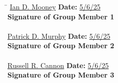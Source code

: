 \documentclass{article}
\begin{document}
\begin{tabbing}
\hspace{8cm}\=\kill
\underline{\hspace{3.0cm}Ian D. Mooney} \> \textbf{Date:} \underline{\hspace{3cm}5/6/25} \\
\textbf{Signature of Group Member 1} \\
\\
\underline{\hspace{2.5cm}Patrick D. Murphy} \> \textbf{Date:} \underline{\hspace{3cm}5/6/25} \\
\textbf{Signature of Group Member 2} \\
\\
\underline{\hspace{2.5cm}Russell R. Cannon} \> \textbf{Date:} \underline{\hspace{3cm}5/6/25} \\
\textbf{Signature of Group Member 3} \\
\\

\end{tabbing}
\end{document}
